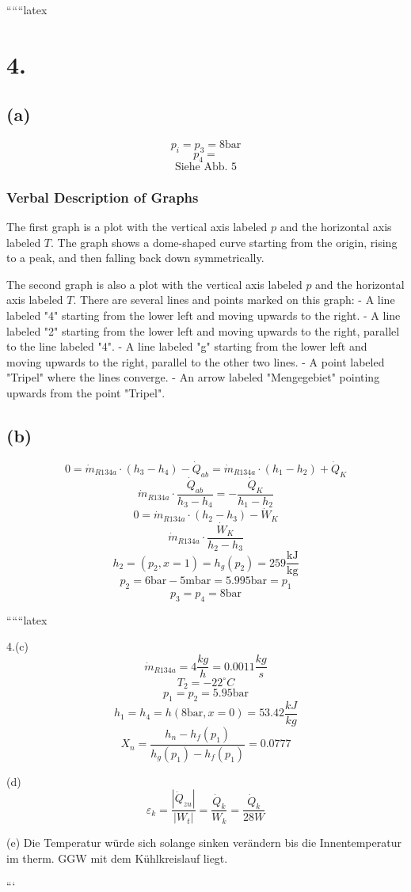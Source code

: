
``````latex


\section*{4.}
\subsection*{(a)}
\[
p_i = p_3 = 8 \text{bar}
\]
\[
p_4 = 
\]
\[
\text{Siehe Abb. 5}
\]

\subsubsection*{Verbal Description of Graphs}

The first graph is a plot with the vertical axis labeled \( p \) and the horizontal axis labeled \( T \). The graph shows a dome-shaped curve starting from the origin, rising to a peak, and then falling back down symmetrically.

The second graph is also a plot with the vertical axis labeled \( p \) and the horizontal axis labeled \( T \). There are several lines and points marked on this graph:
- A line labeled "4" starting from the lower left and moving upwards to the right.
- A line labeled "2" starting from the lower left and moving upwards to the right, parallel to the line labeled "4".
- A line labeled "g" starting from the lower left and moving upwards to the right, parallel to the other two lines.
- A point labeled "Tripel" where the lines converge.
- An arrow labeled "Mengegebiet" pointing upwards from the point "Tripel".

\subsection*{(b)}
\[
0 = \dot{m}_{R134a} \cdot (h_3 - h_4) - \dot{Q}_{ab} = \dot{m}_{R134a} \cdot (h_1 - h_2) + \dot{Q}_K
\]
\[
\dot{m}_{R134a} \cdot \frac{\dot{Q}_{ab}}{h_3 - h_4} = - \frac{\dot{Q}_K}{h_1 - h_2}
\]
\[
0 = \dot{m}_{R134a} \cdot (h_2 - h_3) - \dot{W}_K
\]
\[
\dot{m}_{R134a} \cdot \frac{\dot{W}_K}{h_2 - h_3}
\]
\[
h_2 = (p_2, x=1) = h_g(p_2) = 259 \frac{\text{kJ}}{\text{kg}}
\]
\[
p_2 = 6 \text{bar} - 5 \text{mbar} = 5.995 \text{bar} = p_1
\]
\[
p_3 = p_4 = 8 \text{bar}
\]

``````latex


4.(c) 
\[
\dot{m}_{R134a} = 4 \frac{kg}{h} = 0.0011 \frac{kg}{s}
\]
\[
T_2 = -22^\circ C
\]
\[
p_1 = p_2 = 5.95 \text{bar}
\]
\[
h_1 = h_4 = h(8 \text{bar}, x=0) = 53.42 \frac{kJ}{kg}
\]
\[
X_n = \frac{h_n - h_f(p_1)}{h_g(p_1) - h_f(p_1)} = 0.0777
\]

(d) 
\[
\varepsilon_k = \frac{|\dot{Q}_{zu}|}{|W_t|} = \frac{\dot{Q}_k}{W_k} = \frac{\dot{Q}_k}{28W}
\]

(e) 
Die Temperatur würde sich solange sinken verändern bis die Innentemperatur im therm. GGW mit dem Kühlkreislauf liegt.

```